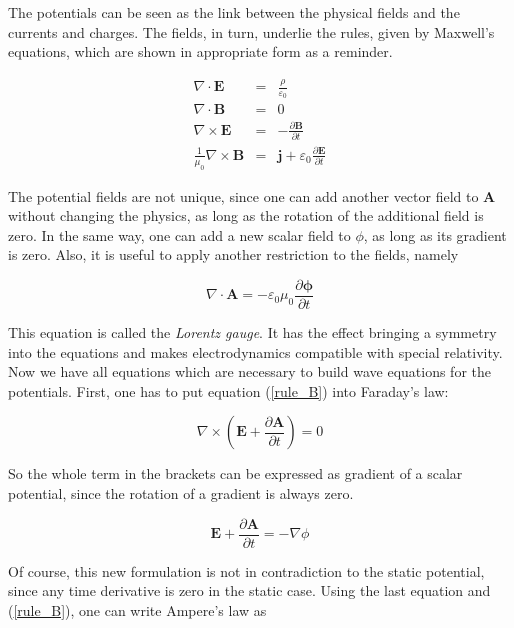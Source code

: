 \documentclass[a4paper,14pt]{extbook}
\begin{document}
The potentials can be seen as the link between the physical fields and the currents and charges. The  fields, in turn, underlie the rules, given by Maxwell's equations, which are shown in appropriate form as a reminder.

\begin{eqnarray}\label{maxwell}
\nabla \cdot \mathbf{E}&=&\frac{\rho}{\varepsilon_0}\\
\nabla \cdot \mathbf{B}&=&0\\
\nabla \times \mathbf{E}&=&-\frac{\partial \mathbf{B}}{\partial t}\\
\frac{1}{\mu_0}\nabla \times \mathbf{B}&=&\mathbf{j}+\varepsilon_0 \frac{\partial \mathbf{E}}{\partial t}
\end{eqnarray}

The potential fields are not unique, since one can add another vector field to \textbf{A} without changing the physics, as long as the rotation of the additional field is zero. In the same way, one can add a new scalar field to $\phi$, as long as its gradient is zero. Also, it is useful to apply another restriction to the fields, namely

\begin{equation}\label{lorenz}
\nabla \cdot \mathbf{A}=-\varepsilon_0 \mu_0\frac{\partial \mathbf{\phi}}{\partial t}
\end{equation}

This equation is called the \emph{Lorentz gauge}. It has the effect bringing a symmetry into the equations and makes electrodynamics compatible with special relativity. Now we have all equations which are necessary to build wave equations for the potentials. First, one has to put equation (\ref{rule_B}) into Faraday's law:

\begin{equation}
\nabla \times \left( \mathbf{E}+\frac{\partial \mathbf{A}}{\partial t} \right) = 0
\end{equation}

So the whole term in the brackets can be expressed as gradient of a scalar potential, since the rotation of a gradient is always zero.

\begin{equation}\label{expressed_as_gradient}
\mathbf{E}+\frac{\partial \mathbf{A}}{\partial t} = -\nabla \phi
\end{equation}

Of course, this new formulation is not in contradiction to the static potential, since any time derivative is zero in the static case. Using the last equation and (\ref{rule_B}), one can write Ampere's law as
\end{document}
